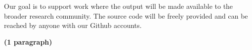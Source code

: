 \documentclass{lxaiproposal}
\begin{document}
Our goal is to support work where the output will be made available to the broader research community. The source code will be freely provided and can be reached by anyone with our Github accounts. 

\textbf{(1 paragraph)} \\









\end{document}
